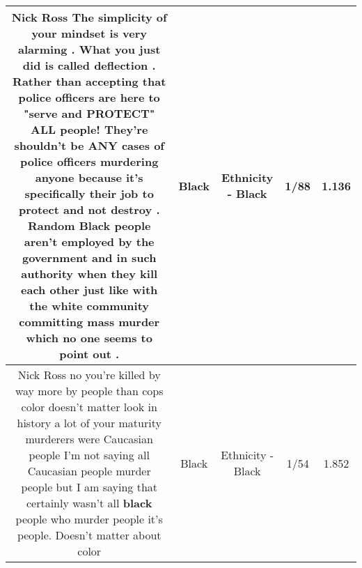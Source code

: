 \documentclass[11pt]{article}
\newlength\mylength
\begin{document}
\begin{center}
\begin{longtable}{|C{.65\mylength}|C{.30\mylength}|C{.12\mylength}|C{.12\mylength}|C{.12\mylength}|}
  \small Nick  Ross The simplicity of your mindset is very alarming . What you just did is called deflection . Rather than accepting that police officers are here to "serve and PROTECT" ALL people! They're shouldn't be ANY cases of police officers murdering anyone because it's specifically their job to protect and not destroy . Random \textbf{Black} people aren't employed by the government and in such authority when they kill each other just like with the white community committing mass murder which no one seems to point out .\normalsize   & Black & Ethnicity - Black & 1/88 & 1.136 \\  \hline
  \small Nick  Ross no you're killed by way more by people than cops color doesn't matter look in history a lot of your maturity murderers were Caucasian people I'm not saying all Caucasian people murder people but I am saying that certainly wasn't all \textbf{black} people who murder people it's people. Doesn't matter about color\normalsize   & Black & Ethnicity - Black & 1/54 & 1.852 \\  \hline
  
\end{longtable}
\end{center}
\end{document}
